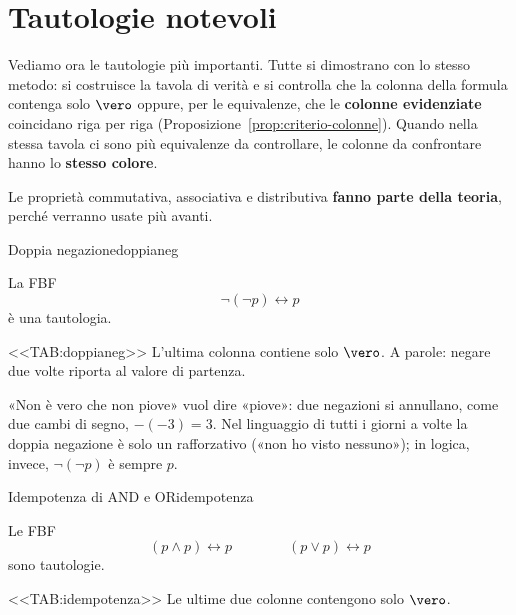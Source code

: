 \section{Tautologie notevoli}\label{sec:tautologie-notevoli}

Vediamo ora le tautologie più importanti. Tutte si dimostrano con lo stesso metodo: si costruisce la tavola
di verità e si controlla che la colonna della formula contenga solo $\vero$ oppure, per le equivalenze,
che le \textbf{colonne evidenziate} coincidano riga per riga (Proposizione~\ref{prop:criterio-colonne}).
Quando nella stessa tavola ci sono più equivalenze da controllare, le colonne da confrontare hanno lo
\textbf{stesso colore}.

Le proprietà commutativa, associativa e distributiva \textbf{fanno parte della teoria}, perché verranno usate più avanti.

\begin{concetto}
\begin{Proposizione}{Doppia negazione}{doppianeg}
    \begin{prerequisiti}
    \end{prerequisiti}
    La FBF
    \[ \neg(\neg p) \leftrightarrow p \]
    è una tautologia.
\end{Proposizione}

\begin{dimostrazione}
    <<TAB:doppianeg>>
    L'ultima colonna contiene solo $\vero$. A parole: negare due volte riporta al valore di partenza.
\end{dimostrazione}
\end{concetto}

\begin{spiegazione}
    «Non è vero che non piove» vuol dire «piove»: due negazioni si annullano, come due cambi di segno, $-(-3) = 3$. Nel linguaggio di tutti i giorni a
    volte la doppia negazione è solo un rafforzativo («non ho visto nessuno»); in logica, invece, $\neg(\neg p)$ è sempre $p$.
\end{spiegazione}


\begin{concetto}
\begin{Proposizione}{Idempotenza di AND e OR}{idempotenza}
    \begin{prerequisiti}
    \end{prerequisiti}
    Le FBF
    \[ (p \wedge p) \leftrightarrow p \qquad\qquad (p \vee p) \leftrightarrow p \]
    sono tautologie.
\end{Proposizione}

\begin{dimostrazione}
    <<TAB:idempotenza>>
    Le ultime due colonne contengono solo $\vero$.
\end{dimostrazione}
\end{concetto}

